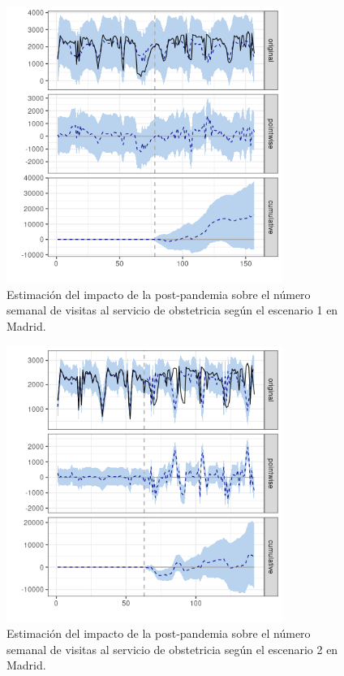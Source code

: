 \documentclass[12pt,twoside]{article} %
\begin{document}
  \begin{center}
  \begin{figure}[H]
  \includegraphics[width=9cm]{obstetrics_post_scen1_Madrid.png}\caption{Estimación del impacto de la post-pandemia sobre el número semanal de visitas al servicio de obstetricia según el escenario 1 en Madrid.}
  \end{figure}
  \end{center}
  
  \begin{center}
    \begin{figure}[H]
      \includegraphics[width=9cm]{obstetrics_post_scen2_Madrid.png}\caption{Estimación del impacto de la post-pandemia sobre el número semanal de visitas al servicio de obstetricia según el escenario 2 en Madrid.}
    \end{figure}
    \end{center}
\end{document}

